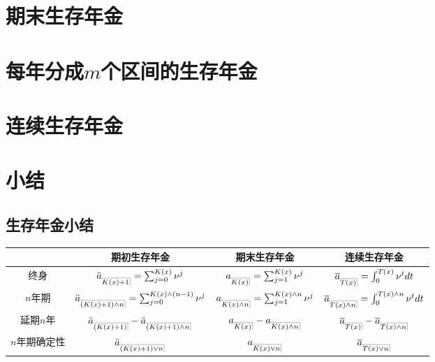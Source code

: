 \documentclass[lang=cn,10pt]{elegantbook}
\makeatletter
\DeclareRobustCommand{\annu}[1]{_{%
    \def\arraystretch{0}%
    \setlength\arraycolsep{1pt}%
    \setlength\arrayrulewidth{.2pt}%
    \begin{array}[b]{@{}c|}\hline
        \\[\arraycolsep]%
        \scriptstyle #1%
    \end{array}%
}}
\makeatother
\begin{document}
\section{期末生存年金}

\section{每年分成$m$个区间的生存年金}

\section{连续生存年金}


\section{小结}
\subsection{生存年金小结}
\begin{center}
    \begin{tabular}{c|c|c|c}
        \hline
        & 期初生存年金 & 期末生存年金 & 连续生存年金 \\
        \hline
        终身 & $\ddot a_{\annu{K(x)+1}} = \sum_{j=0}^{K(x)}{\nu^j}$ & $a_{\annu{K(x)}} = \sum_{j=1}^{K(x)}{\nu^j}$ & $\overline{a}_{\annu{T(x)}}=\int_0^{T(x)} \nu^tdt$ \\
        \hline
        $n$年期 & $\ddot a_{\annu{(K(x)+1)\land n}} = \sum_{j=0}^{K(x)\land (n-1)}{\nu^j}$ & $a_{\annu{K(x)\land n}} = \sum_{j=1}^{K(x)\land n}{\nu^j}$ & $  \overline{a}_{\annu{T(x)\land n}}=\int_0^{T(x)\land n} \nu^tdt$ \\
        \hline
        延期$n$年 & $\ddot a_{\annu{(K(x)+1)}} - \ddot a_{\annu{(K(x)+1)\land n}}$ & $a_{\annu{K(x)}} - a_{\annu{K(x)\land n}}$ & $\overline{a}_{\annu{T(x)}} - \overline{a}_{\annu{T(x)\land n}}$  \\
        \hline
        $n$年期确定性 & $\ddot a_{\annu{(K(x)+1)\lor n}}$ & $a_{\annu{K(x)\lor n}}$ & $\overline{a}_{\annu{T(x)\lor n}}$  \\  
        \hline
    \end{tabular}
\end{center}
\end{document}

